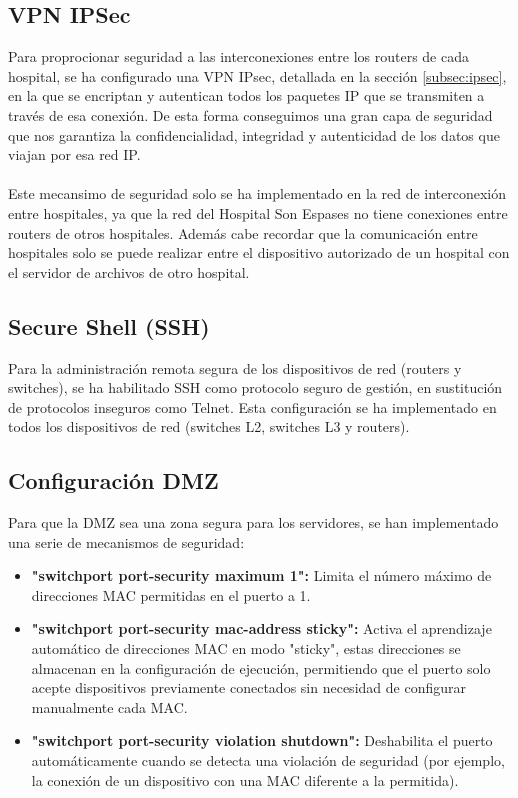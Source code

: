 \subsection{VPN IPSec}
Para proprocionar seguridad a las interconexiones entre los routers de cada hospital, se ha configurado una VPN IPsec, detallada en la sección \ref{subsec:ipsec}, en la que se encriptan y autentican todos los paquetes IP que se transmiten a través de esa conexión.
De esta forma conseguimos una gran capa de seguridad que nos garantiza la confidencialidad, integridad y autenticidad de los datos que viajan por esa red IP.
\\ \\
Este mecansimo de seguridad solo se ha implementado en la red de interconexión entre hospitales, ya que la red del Hospital Son Espases no tiene conexiones entre routers de otros hospitales. 
Además cabe recordar que la comunicación entre hospitales solo se puede realizar entre el dispositivo autorizado de un hospital con el servidor de archivos de otro hospital.

\subsection{Secure Shell (SSH)}
Para la administración remota segura de los dispositivos de red (routers y switches), se ha habilitado SSH como protocolo seguro de gestión, en sustitución de protocolos inseguros como Telnet. 
Esta configuración se ha implementado en todos los dispositivos de red (switches L2, switches L3 y routers). 

\subsection{Configuración DMZ}\label{subsec:dmz}
Para que la DMZ sea una zona segura para los servidores, se han implementado una serie de mecanismos de seguridad:
\begin{itemize}
    \item \textbf{"switchport port-security maximum 1":} Limita el número máximo de direcciones \ac{MAC} permitidas en el puerto a 1.
    \item \textbf{"switchport port-security mac-address sticky":} Activa el aprendizaje automático de direcciones MAC en modo "sticky", estas direcciones se almacenan en la configuración de ejecución, permitiendo que el puerto solo acepte dispositivos previamente conectados sin necesidad de configurar manualmente cada MAC.
    \item \textbf{"switchport port-security violation shutdown":} Deshabilita el puerto automáticamente cuando se detecta una violación de seguridad (por ejemplo, la conexión de un dispositivo con una MAC diferente a la permitida).
\end{itemize}

